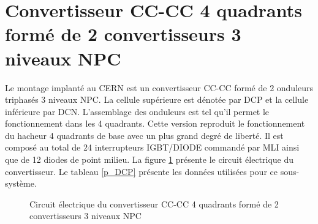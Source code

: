 \section{Convertisseur CC-CC 4 quadrants formé de 2 convertisseurs 3 niveaux NPC}
Le montage implanté au CERN est un convertisseur CC-CC formé de 2 onduleurs triphasés 3 niveaux NPC. La cellule supérieure est dénotée par DCP et la cellule inférieure par DCN. L'assemblage des onduleurs est tel qu'il permet le fonctionnement dans les 4 quadrants. Cette version reproduit le fonctionnement du hacheur 4 quadrants de base avec un plus grand degré de liberté. Il est composé au total de 24 interrupteurs IGBT/DIODE commandé par MLI ainsi que de 12 diodes de point milieu. La figure \ref{circuit_DCP_DCN} présente le circuit électrique du convertisseur. Le tableau \ref{p_DCP} présente les données utilisées pour ce sous-système.


\begin{figure}[htb]
\caption{Circuit électrique du convertisseur CC-CC 4 quadrants formé de 2 convertisseurs 3 niveaux NPC}
\label{circuit_DCP_DCN}
\end{figure}


